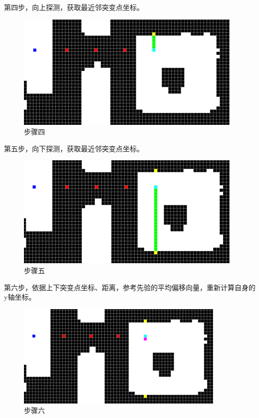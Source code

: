 第四步，向上探测，获取最近邻突变点坐标。

\begin{figure}[!htbp]
\centering
\includegraphics[scale=1]{figures/QR_Prf/图片4.png}
\caption{步骤四}
\end{figure}

第五步，向下探测，获取最近邻突变点坐标。

\begin{figure}[!htbp]
\centering
\includegraphics[scale=1]{figures/QR_Prf/图片5.png}
\caption{步骤五}
\end{figure}

第六步，依据上下突变点坐标、距离，参考先验的平均偏移向量，重新计算自身的y轴坐标。

\begin{figure}[!htbp]
\centering
\includegraphics[scale=1]{figures/QR_Prf/图片6.png}
\caption{步骤六}
\end{figure}


